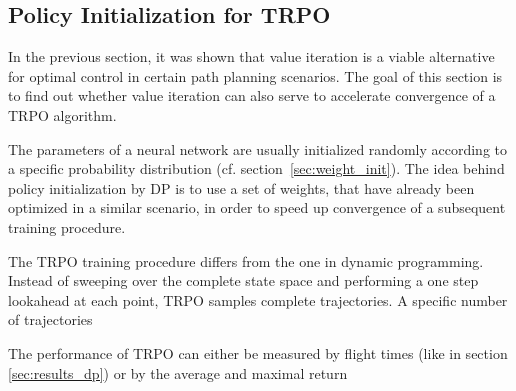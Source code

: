 \subsection{Policy Initialization for TRPO}

In the previous section, it was shown that value iteration is a viable alternative for optimal control in certain path planning scenarios. The goal of this section is to find out whether value iteration can also serve to accelerate convergence of a TRPO algorithm.

The parameters of a neural network are usually initialized randomly according to a specific probability distribution (cf. section~\ref{sec:weight_init}). The idea behind policy initialization by DP is to use a set of weights, that have already been optimized in a similar scenario, in order to speed up convergence of a subsequent training procedure.

The TRPO training procedure differs from the one in dynamic programming. Instead of sweeping over the complete state space and performing a one step lookahead at each point, TRPO samples complete trajectories. A specific number of trajectories 

The performance of TRPO can either be measured by flight times (like in section \ref{sec:results_dp}) or by the average and maximal return

